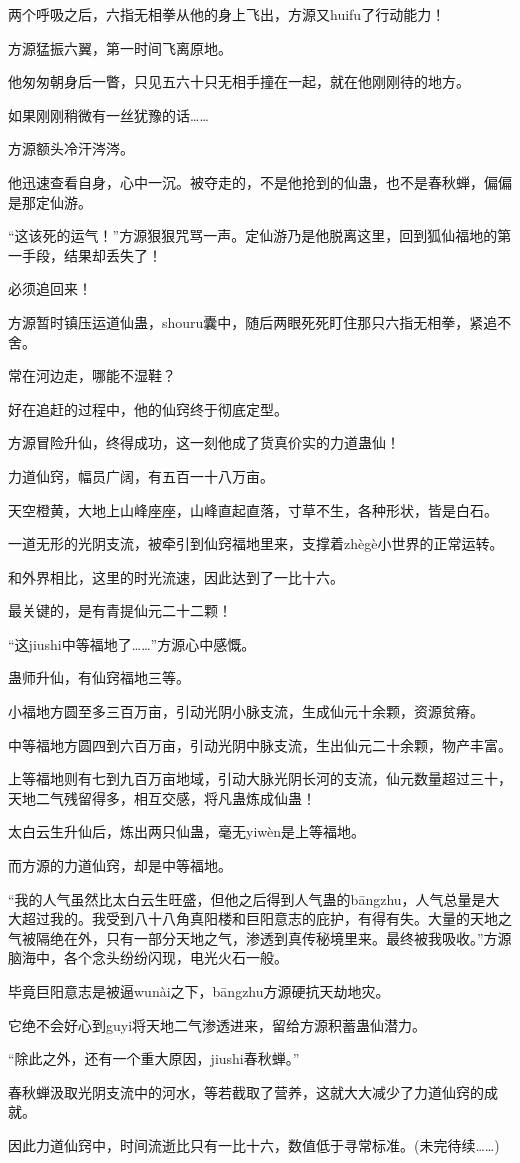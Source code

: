 \begin{this_body}
两个呼吸之后，六指无相拳从他的身上飞出，方源又huifu了行动能力！

方源猛振六翼，第一时间飞离原地。

他匆匆朝身后一瞥，只见五六十只无相手撞在一起，就在他刚刚待的地方。

如果刚刚稍微有一丝犹豫的话……

方源额头冷汗涔涔。

他迅速查看自身，心中一沉。被夺走的，不是他抢到的仙蛊，也不是春秋蝉，偏偏是那定仙游。

“这该死的运气！”方源狠狠咒骂一声。定仙游乃是他脱离这里，回到狐仙福地的第一手段，结果却丢失了！

必须追回来！

方源暂时镇压运道仙蛊，shouru囊中，随后两眼死死盯住那只六指无相拳，紧追不舍。

常在河边走，哪能不湿鞋？

好在追赶的过程中，他的仙窍终于彻底定型。

方源冒险升仙，终得成功，这一刻他成了货真价实的力道蛊仙！

力道仙窍，幅员广阔，有五百一十八万亩。

天空橙黄，大地上山峰座座，山峰直起直落，寸草不生，各种形状，皆是白石。

一道无形的光阴支流，被牵引到仙窍福地里来，支撑着zhègè小世界的正常运转。

和外界相比，这里的时光流速，因此达到了一比十六。

最关键的，是有青提仙元二十二颗！

“这jiushi中等福地了……”方源心中感慨。

蛊师升仙，有仙窍福地三等。

小福地方圆至多三百万亩，引动光阴小脉支流，生成仙元十余颗，资源贫瘠。

中等福地方圆四到六百万亩，引动光阴中脉支流，生出仙元二十余颗，物产丰富。

上等福地则有七到九百万亩地域，引动大脉光阴长河的支流，仙元数量超过三十，天地二气残留得多，相互交感，将凡蛊炼成仙蛊！

太白云生升仙后，炼出两只仙蛊，毫无yiwèn是上等福地。

而方源的力道仙窍，却是中等福地。

“我的人气虽然比太白云生旺盛，但他之后得到人气蛊的bāngzhu，人气总量是大大超过我的。我受到八十八角真阳楼和巨阳意志的庇护，有得有失。大量的天地之气被隔绝在外，只有一部分天地之气，渗透到真传秘境里来。最终被我吸收。”方源脑海中，各个念头纷纷闪现，电光火石一般。

毕竟巨阳意志是被逼wunài之下，bāngzhu方源硬抗天劫地灾。

它绝不会好心到guyi将天地二气渗透进来，留给方源积蓄蛊仙潜力。

“除此之外，还有一个重大原因，jiushi春秋蝉。”

春秋蝉汲取光阴支流中的河水，等若截取了营养，这就大大减少了力道仙窍的成就。

因此力道仙窍中，时间流逝比只有一比十六，数值低于寻常标准。(未完待续……)

\end{this_body}

